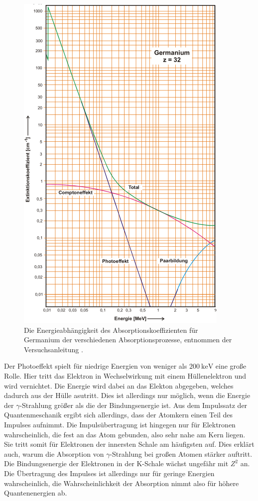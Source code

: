 \begin{figure}
  \centering
  \includegraphics[scale=0.7]{pictures/Gammaabsorption.png}
  \caption{Die Energieabhängigkeit des Absorptionskoeffizienten für Germanium der verschiedenen Absorptionsprozesse, entnommen der Versuchsanleitung \cite[236]{sample}.}
  \label{fig:Gammaabsorption}
\end{figure}

Der Photoeffekt spielt für niedrige Energien von weniger als $\SI{200}{\kilo\electronvolt}$ eine große Rolle.
Hier tritt das Elektron in Wechselwirkung mit einem Hüllenelektron und wird vernichtet.
Die Energie wird dabei an das Elekton abgegeben, welches dadurch aus der Hülle asutritt.
Dies ist allerdings nur möglich, wenn die Energie der $\gamma$-Strahlung größer als die der Bindungsenergie ist.
Aus dem Impulssatz der Quantenmeschanik ergibt sich allerdings, dass der Atomkern einen Teil des Impulses aufnimmt.
Die Impulsübertragung ist hingegen nur für Elektronen wahrscheinlich, die fest an das Atom gebunden, also sehr nahe am Kern liegen.
Sie tritt somit für Elektronen der innersten Schale am häufigsten auf.
Dies erklärt auch, warum die Absorption von $\gamma$-Strahlung bei großen Atomen stärker auftritt.
Die Bindungsenergie der Elektronen in der K-Schale wächst ungefähr mit $Z^2$ an.
Die Übertragung des Impulses ist allerdings nur für geringe Energien wahrscheinlich, die Wahrscheinlichkeit der Absorption nimmt also für höhere Quantenenergien ab.


